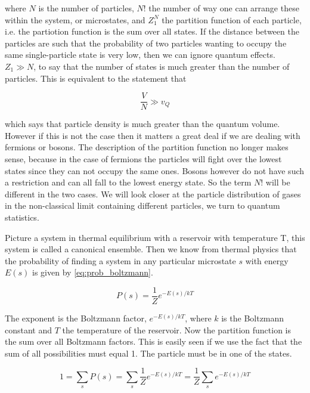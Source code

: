where $N$ is the number of particles, $N!$ the number of way one can arrange these within the system, or microstates, and $Z_1^N$ the partition function of each particle, i.e. the partiotion function is the sum over all states.  
If the distance between the particles are such that the probability of two particles wanting to occupy the same single-particle state is very low, then we can ignore quantum effects. $Z_1 \gg N$, to say that the number of states is much greater than the number of particles. This is equivalent to the statement that

\begin{equation}
\frac{V}{N} \gg v_Q
\end{equation}

which says that particle density is much greater than the quantum volume. 
However if this is not the case then it matters a great deal if we are dealing with fermions or bosons. The description of the partition function no longer makes sense, because in the case of fermions the particles will fight over the lowest states since they can not occupy the same ones. Bosons however do not have such a restriction and can all fall to the lowest energy state. So the term $N!$ will be different in the two cases. We will look closer at the particle distribution of gases in the non-classical limit containing different particles, we turn to quantum statistics.

Picture a system in thermal equilibrium with a reservoir with temperature T, this system is called a canonical ensemble. Then we know from thermal physics that the probability of finding a system in any particular microstate $s$ with energy $E(s)$ is given by \eqref{eq:prob_boltzmann}.

\begin{equation} \label{eq:prob_boltzmann}
P(s) =  \frac{1}{Z} e^{-E(s)/kT}    
\end{equation}

The exponent is the Boltzmann factor, $e^{-E(s)/kT}$, where $k$ is the Boltzmann constant and $T$ the temperature of the reservoir. Now the partition function is the sum over all Boltzmann factors. This is easily seen if we use the fact that the sum of all possibilities must equal 1. The particle must be in one of the states. 


\begin{equation}
1 = \sum_s P(s) = \sum_s \frac{1}{Z} e^{-E(s)/kT} = \frac{1}{Z} \sum_s e^{-E(s)/kT}
\end{equation}

